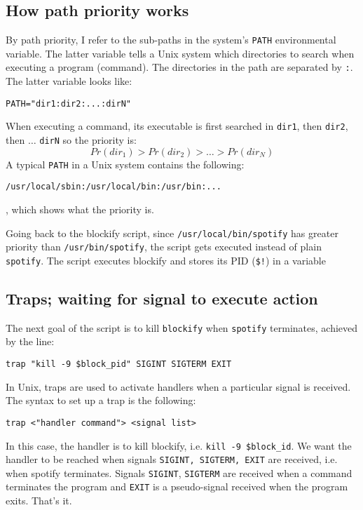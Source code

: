 \documentclass[a4paper]{article}
\begin{document}
\subsection{How path priority works}

By path priority, I refer to the sub-paths in the system's \texttt{PATH} environmental variable. The latter variable tells a Unix system which directories to search when executing a program (command). The directories in the path are separated by \texttt{:}. The latter variable looks like:
\begin{verbatim}
PATH="dir1:dir2:...:dirN"	
\end{verbatim}
When executing a command, its executable is first searched in \texttt{dir1}, then \texttt{dir2}, then $\ldots$ \texttt{dirN} so the priority is:
\[
	Pr(dir_1) > Pr(dir_2) > \ldots > Pr(dir_N)
\]
A typical \texttt{PATH} in a Unix system contains the following:
\begin{verbatim}
/usr/local/sbin:/usr/local/bin:/usr/bin:...
\end{verbatim}
, which shows what the priority is. 

Going back to the blockify script, since \texttt{/usr/local/bin/spotify} has greater priority than \texttt{/usr/bin/spotify}, the script gets executed instead of plain \texttt{spotify}. The script executes blockify and stores its PID (\texttt{\$!}) in a variable


\subsection{Traps; waiting for signal to execute action}

The next goal of the script is to kill \texttt{blockify} when \texttt{spotify} terminates, achieved by the line:
\begin{verbatim}
trap "kill -9 $block_pid" SIGINT SIGTERM EXIT
\end{verbatim}
In Unix, traps are used to activate handlers when a particular signal is received. The syntax to set up a trap is the following:
\begin{verbatim}
trap <"handler command"> <signal list>
\end{verbatim}
In this case, the handler is to kill blockify, i.e. \texttt{kill -9 \$block\_id}. We want the handler to be reached when signals \texttt{SIGINT, SIGTERM, EXIT} are received, i.e. when spotify terminates. Signals \texttt{SIGINT}, \texttt{SIGTERM} are received when a command terminates the program and \texttt{EXIT} is a pseudo-signal received when the program exits. That's it.
\end{document}
